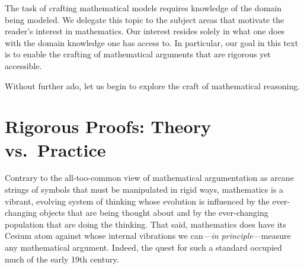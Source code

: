 \bigskip

The task of crafting mathematical models requires knowledge of the domain being modeled.  We delegate this topic to the subject areas that motivate the reader's interest in mathematics.  Our interest resides solely in what one does with the domain knowledge one has access to.  In particular, our goal in this text is to enable the crafting of mathematical arguments that are rigorous yet accessible.

\smallskip

Without further ado, let us begin to explore the craft of mathematical reasoning.

\section{Rigorous Proofs: Theory vs.~Practice}
\label{sec:reasoning-via-proofs}

Contrary to the all-too-common view of mathematical argumentation as arcane strings of symbols that must be manipulated in rigid ways, mathematics is a vibrant, evolving system of thinking whose evolution is influenced by the ever-changing objects that are being thought about and by the ever-changing population that are doing the thinking.  That said, mathematics does have its Cesium atom against whose internal vibrations we can---{\em in principle}---measure any mathematical argument.  Indeed, the quest for such a standard occupied much of the early 19th century.

\bigskip

